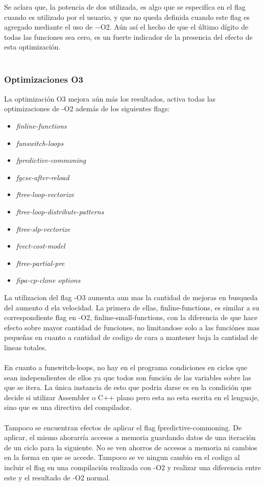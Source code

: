 Se aclara que, la potencia de dos utilizada, es algo que se especifíca en el flag cuando es utilizado por el usuario, y que no queda definida cuando este flag es agregado mediante el uso de $-$O2. Aún así el hecho de que el último dígito de todas las funciones sea cero, es un fuerte indicador de la presencia del efecto de esta optimización.\\


~\\


\subsubsection{Optimizaciones O3}

La optimización O3 mejora aún más los resultados, activa todas las optimizaciones de -O2 además de los siguientes flags:
~\\
\begin{itemize}
\item \textit{finline-functions}
\item \textit{funswitch-loops}
\item \textit{fpredictive-commoning}
\item \textit{fgcse-after-reload}
\item \textit{ftree-loop-vectorize}
\item \textit{ftree-loop-distribute-patterns}
\item \textit{ftree-slp-vectorize}
\item \textit{fvect-cost-model}
\item \textit{ftree-partial-pre}
\item \textit{fipa-cp-clone options}
\end{itemize}

La utilizacion del flag -O3 aumenta aun mas la cantidad de mejoras en busqueda del aumento d ela velocidad. La primera de ellas, finline-functions, es similar a su correspondiente flag en -O2, finline-small-functions, con la diferencia de que hace efecto sobre mayor cantidad de funciones, no limitandose solo a las funciónes mas pequeñas en cuanto a cantidad de codigo de cara a mantener baja la cantidad de lineas totales.
~\\
~\\
En cuanto a funswitch-loops, no hay en el programa condiciones en ciclos que sean independientes de ellos ya que todos son función de las variables sobre las que se itera. La única instancia de esto que podria darse es en la condición que decide si utilizar Assembler o C++ plano pero esta no esta escrita en el lenguaje, sino que es una directiva del compilador.
~\\
~\\
Tampoco se encuentran efectos de aplicar el flag fpredictive-commoning. De aplicar, el mismo ahorarría accesos a memoria guardando datos de una iteración de un ciclo para la siguiente. No se ven ahorros de accesos a memoria ni cambios en la forma en que se accede. Tampoco se ve ningun cambio en el codigo al incluir el flag en una compilación realizada con -O2 y realizar una diferencia entre este y el resultado de -O2 normal.


